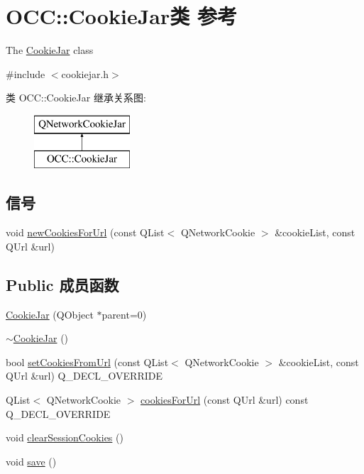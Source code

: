 \hypertarget{class_o_c_c_1_1_cookie_jar}{}\section{O\+CC\+:\+:Cookie\+Jar类 参考}
\label{class_o_c_c_1_1_cookie_jar}


The \hyperlink{class_o_c_c_1_1_cookie_jar}{Cookie\+Jar} class  




{\ttfamily \#include $<$cookiejar.\+h$>$}

类 O\+CC\+:\+:Cookie\+Jar 继承关系图\+:\begin{figure}[H]
\begin{center}
\leavevmode
\includegraphics[height=2.000000cm]{class_o_c_c_1_1_cookie_jar}
\end{center}
\end{figure}
\subsection*{信号}
\begin{DoxyCompactItemize}
\item 
void \hyperlink{class_o_c_c_1_1_cookie_jar_a3616e6578fd9a3d23d79fac5b222d419}{new\+Cookies\+For\+Url} (const Q\+List$<$ Q\+Network\+Cookie $>$ \&cookie\+List, const Q\+Url \&url)
\end{DoxyCompactItemize}
\subsection*{Public 成员函数}
\begin{DoxyCompactItemize}
\item 
\hyperlink{class_o_c_c_1_1_cookie_jar_ac0ec7f67133657b68d5c16419a33c7f9}{Cookie\+Jar} (Q\+Object $\ast$parent=0)
\item 
\hyperlink{class_o_c_c_1_1_cookie_jar_a25624760d827c28880b7ff4cf9adab78}{$\sim$\+Cookie\+Jar} ()
\item 
bool \hyperlink{class_o_c_c_1_1_cookie_jar_aaceb253821c62dd72d38e17918ec2e25}{set\+Cookies\+From\+Url} (const Q\+List$<$ Q\+Network\+Cookie $>$ \&cookie\+List, const Q\+Url \&url) Q\+\_\+\+D\+E\+C\+L\+\_\+\+O\+V\+E\+R\+R\+I\+DE
\item 
Q\+List$<$ Q\+Network\+Cookie $>$ \hyperlink{class_o_c_c_1_1_cookie_jar_ae1870640258b6639b021b45e726b654a}{cookies\+For\+Url} (const Q\+Url \&url) const Q\+\_\+\+D\+E\+C\+L\+\_\+\+O\+V\+E\+R\+R\+I\+DE
\item 
void \hyperlink{class_o_c_c_1_1_cookie_jar_ac7f5a75eed7916e2ec63ad1634c6567f}{clear\+Session\+Cookies} ()
\item 
void \hyperlink{class_o_c_c_1_1_cookie_jar_a3f1a5498c56e0a01480691a952b34d92}{save} ()
\end{DoxyCompactItemize}


